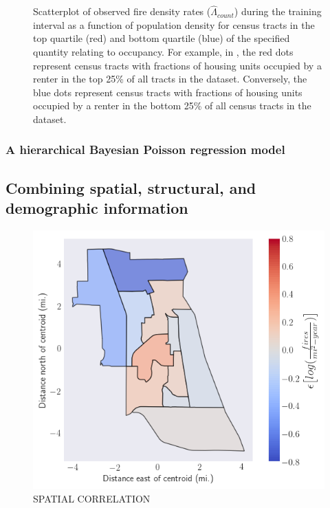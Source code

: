 \documentclass{svjour3}
\begin{document}
\begin{figure}[!htb]
\begin{center}
{          } %
      \end{center}
      \caption{Scatterplot of observed fire density rates ($\hat\Lambda_{count}$) during the training interval as a function of population density for census tracts in the top quartile (red) and bottom quartile (blue) of the specified quantity relating to occupancy. For example, in \protect{}, the red dots represent census tracts with fractions of housing units occupied by a renter in the top 25\% of all tracts in the dataset. Conversely, the blue dots represent census tracts with fractions of housing units occupied by a renter in the bottom 25\% of all census tracts in the dataset.}
     \label{fig:occupancy}
  \end{figure}
 
  \subsubsection{A hierarchical Bayesian Poisson regression model}
  
  
  \subsection{Combining spatial, structural, and demographic information}
  
  
  
\begin{figure}[htb] \centering
\includegraphics[width=.5\textwidth]{figures/spatial_correlation.png}
\caption{SPATIAL CORRELATION}
\label{fig:spatialcorr}
\end{figure}
  
\end{document}
